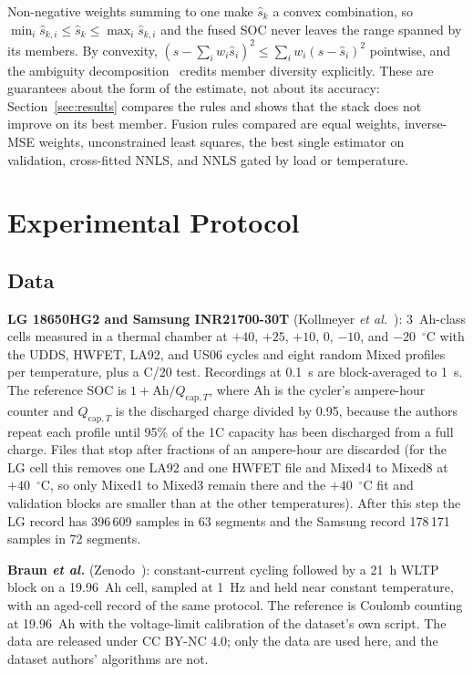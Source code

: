 \documentclass[journal]{IEEEtran}
\begin{document}
Non-negative weights summing to one make $\hat s_k$ a convex combination, so $\min_i\hat s_{k,i}\le\hat s_k\le\max_i\hat s_{k,i}$ and the fused SOC never leaves the range spanned by its members. By convexity, $(s-\sum_iw_i\hat s_i)^2\le\sum_iw_i(s-\hat s_i)^2$ pointwise, and the ambiguity decomposition~\cite{krogh1995ensembles} credits member diversity explicitly. These are guarantees about the form of the estimate, not about its accuracy: Section~\ref{sec:results} compares the rules and shows that the stack does not improve on its best member. Fusion rules compared are equal weights, inverse-MSE weights, unconstrained least squares, the best single estimator on validation, cross-fitted NNLS, and NNLS gated by load or temperature.


\section{Experimental Protocol}\label{sec:setup}
\subsection{Data}
\textbf{LG 18650HG2 and Samsung INR21700-30T} (Kollmeyer \emph{et al.}~\cite{kollmeyer2020lg,kollmeyer2020samsung}): 3~Ah-class cells measured in a thermal chamber at $+40$, $+25$, $+10$, $0$, $-10$, and $-20$~$^\circ$C with the UDDS, HWFET, LA92, and US06 cycles and eight random Mixed profiles per temperature, plus a C/20 test. Recordings at 0.1~s are block-averaged to 1~s. The reference SOC is $1+\mathrm{Ah}/Q_{\mathrm{cap},T}$, where Ah is the cycler's ampere-hour counter and $Q_{\mathrm{cap},T}$ is the discharged charge divided by 0.95, because the authors repeat each profile until 95\% of the 1C capacity has been discharged from a full charge. Files that stop after fractions of an ampere-hour are discarded (for the LG cell this removes one LA92 and one HWFET file and Mixed4 to Mixed8 at $+40$~$^\circ$C, so only Mixed1 to Mixed3 remain there and the $+40$~$^\circ$C fit and validation blocks are smaller than at the other temperatures). After this step the LG record has 396\,609 samples in 63 segments and the Samsung record 178\,171 samples in 72 segments.

\textbf{Braun \emph{et al.}} (Zenodo~\cite{braun2022dataset}): constant-current cycling followed by a 21~h WLTP block on a 19.96~Ah cell, sampled at 1~Hz and held near constant temperature, with an aged-cell record of the same protocol. The reference is Coulomb counting at 19.96~Ah with the voltage-limit calibration of the dataset's own script. The data are released under CC BY-NC 4.0; only the data are used here, and the dataset authors' algorithms are not.
\end{document}
